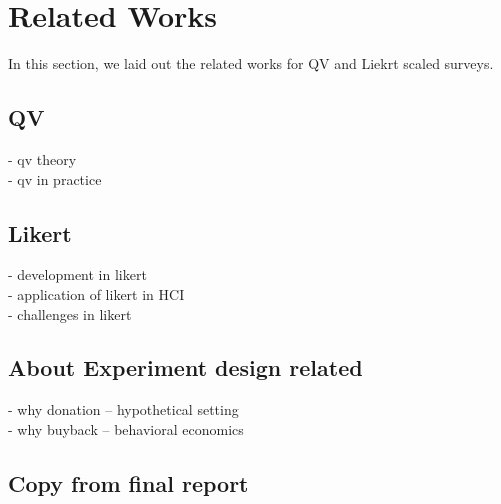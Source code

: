 \section{Related Works} \label{related_works}
In this section, 
we laid out the related works for QV and Liekrt scaled surveys.
\subsection{QV}
- qv theory\\
- qv in practice \\

\subsection{Likert}
- development in likert \\
- application of likert in HCI\\
- challenges in likert \\

\subsection{About Experiment design related}
- why donation -- hypothetical setting\\
- why buyback -- behavioral economics

\subsection{Copy from final report }